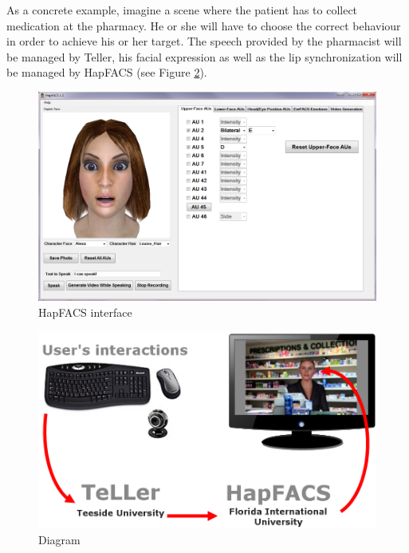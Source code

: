 \documentclass[11pt]{article}
\begin{document}
As a concrete example, imagine a scene where the patient has to collect medication at the pharmacy. He or she will have to choose the correct behaviour in order to achieve his or her target. The speech provided by the pharmacist will be managed by Teller, his facial expression as well as the lip synchronization will be managed by HapFACS (see Figure \ref{Figure finalDiagram}).\\
\begin{figure}[h]
   	\centerline{\includegraphics[scale=0.4]{./images/hapfacsAPI}}
   	\caption{\label{Figure HapFACS} HapFACS interface \cite{Amini13}}
\end{figure}
\begin{figure}[h]
   	\centerline{\includegraphics[scale=0.4]{./images/final_diagram}}
   	\caption{\label{Figure finalDiagram} Diagram}
\end{figure}


\newpage


\end{document}
